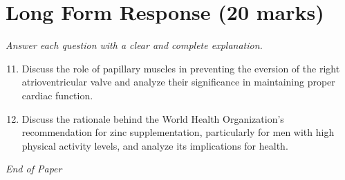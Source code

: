 \documentclass[12pt]{article}
\begin{document}
\section*{Long Form Response (20 marks)}
\textit{Answer each question with a clear and complete explanation.}
\begin{enumerate}[label=\arabic*.]
\setcounter{enumi}{10}
\item Discuss the role of papillary muscles in preventing the eversion of the right atrioventricular valve and analyze their significance in maintaining proper cardiac function.
\item Discuss the rationale behind the World Health Organization's recommendation for zinc supplementation, particularly for men with high physical activity levels, and analyze its implications for health.
\end{enumerate}

\vfill
\noindent\textit{End of Paper}
\end{document}
